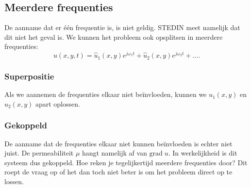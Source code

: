 \documentclass[11pt]{article}
\begin{document}
\subsection{Meerdere frequenties}
De aanname dat er één frequentie is, is niet geldig. STEDIN meet namelijk dat dit niet het geval is. We kunnen het probleem ook opsplitsen in meerdere frequenties:
\begin{equation}
    u(x,y,t) = \hat u_1(x,y) e^{j\omega_1 t} + \hat u_2(x,y) e^{j\omega_2 t} + \dots.
\end{equation}

\subsubsection{Superpositie}
Als we aannemen de frequenties elkaar niet beïnvloeden, kunnen we $\hat u_1(x,y)$ en $\hat u_2(x,y)$ apart oplossen.

\subsubsection{Gekoppeld}
De aanname dat de frequenties elkaar niet kunnen beïnvloeden is echter niet juist. De permeabiliteit $\mu$ hangt namelijk af van $\text{grad} \; u$. In werkelijkheid is dit systeem dus gekoppeld. Hoe reken je tegelijkertijd meerdere frequenties door? Dit roept de vraag op of het dan toch niet beter is om het probleem direct op te lossen.
\end{document}
